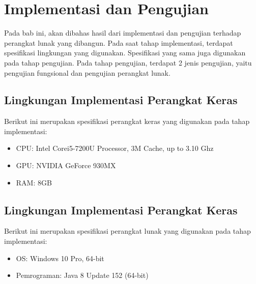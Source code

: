 \chapter{Implementasi dan Pengujian}
Pada bab ini, akan dibahas hasil dari implementasi dan pengujian terhadap perangkat lunak yang dibangun. Pada saat tahap implementasi, terdapat spesifikasi lingkungan yang digunakan. Spesifikasi yang sama juga digunakan pada tahap pengujian. Pada tahap pengujian, terdapat 2 jenis pengujian, yaitu pengujian fungsional dan pengujian perangkat lunak.

\section{Lingkungan Implementasi Perangkat Keras}
Berikut ini merupakan spesifikasi perangkat keras yang digunakan pada tahap implementasi:
\begin{itemize}
	\item CPU: Intel\textsuperscript{\textregistered}{ }Core\texttrademark{ }i5-7200U Processor, 3M Cache, up to 3.10 Ghz
	\item GPU: NVIDIA GeForce 930MX
	\item RAM: 8GB
\end{itemize}

\section{Lingkungan Implementasi Perangkat Keras}
Berikut ini merupakan spesifikasi perangkat lunak yang digunakan pada tahap implementasi:
\begin{itemize}
	\item OS: Windows 10 Pro, 64-bit
	\item Pemrograman: Java 8 Update 152 (64-bit)
\end{itemize}

